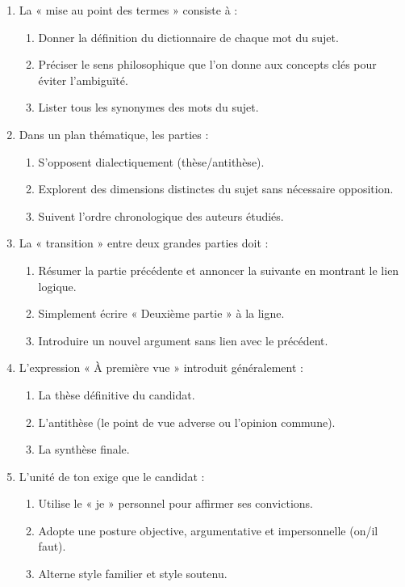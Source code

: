 \documentclass[11pt]{article}
\begin{document}
\begin{exercice}
\begin{enumerate}
    \item La « mise au point des termes » consiste à :
    \begin{enumerate}
        \item Donner la définition du dictionnaire de chaque mot du sujet.
        \item Préciser le sens philosophique que l'on donne aux concepts clés pour éviter l'ambiguïté.
        \item Lister tous les synonymes des mots du sujet.
    \end{enumerate}
    \item Dans un plan thématique, les parties :
    \begin{enumerate}
        \item S'opposent dialectiquement (thèse/antithèse).
        \item Explorent des dimensions distinctes du sujet sans nécessaire opposition.
        \item Suivent l'ordre chronologique des auteurs étudiés.
    \end{enumerate}
    \item La « transition » entre deux grandes parties doit :
    \begin{enumerate}
        \item Résumer la partie précédente et annoncer la suivante en montrant le lien logique.
        \item Simplement écrire « Deuxième partie » à la ligne.
        \item Introduire un nouvel argument sans lien avec le précédent.
    \end{enumerate}
    \item L'expression « À première vue » introduit généralement :
    \begin{enumerate}
        \item La thèse définitive du candidat.
        \item L'antithèse (le point de vue adverse ou l'opinion commune).
        \item La synthèse finale.
    \end{enumerate}
    \item L'unité de ton exige que le candidat :
    \begin{enumerate}
        \item Utilise le « je » personnel pour affirmer ses convictions.
        \item Adopte une posture objective, argumentative et impersonnelle (on/il faut).
        \item Alterne style familier et style soutenu.
    \end{enumerate}
\end{enumerate}
\end{exercice}
\end{document}
